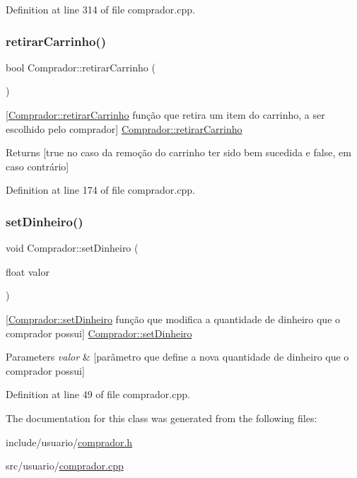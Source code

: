 Definition at line 314 of file comprador.\+cpp.

\mbox{\label{class_comprador_a8a5fc62485a3a9b37340609715e73feb}} 
\subsubsection{\texorpdfstring{retirar\+Carrinho()}{retirarCarrinho()}}
{\footnotesize\ttfamily bool Comprador\+::retirar\+Carrinho (\begin{DoxyParamCaption}{ }\end{DoxyParamCaption})}

\mbox{[}\hyperlink{class_comprador_a8a5fc62485a3a9b37340609715e73feb}{Comprador\+::retirar\+Carrinho} função que retira um item do carrinho, a ser escolhido pelo comprador\mbox{]}  \hyperlink{class_comprador_a8a5fc62485a3a9b37340609715e73feb}{Comprador\+::retirar\+Carrinho} \begin{DoxyReturn}{Returns}
\mbox{[}true no caso da remoção do carrinho ter sido bem sucedida e false, em caso contrário\mbox{]} 
\end{DoxyReturn}


Definition at line 174 of file comprador.\+cpp.

\mbox{\label{class_comprador_a4f22858b4fdd931a81dd8cfcd4783bde}} 
\subsubsection{\texorpdfstring{set\+Dinheiro()}{setDinheiro()}}
{\footnotesize\ttfamily void Comprador\+::set\+Dinheiro (\begin{DoxyParamCaption}\item[{float}]{valor }\end{DoxyParamCaption})}

\mbox{[}\hyperlink{class_comprador_a4f22858b4fdd931a81dd8cfcd4783bde}{Comprador\+::set\+Dinheiro} função que modifica a quantidade de dinheiro que o comprador possui\mbox{]}  \hyperlink{class_comprador_a4f22858b4fdd931a81dd8cfcd4783bde}{Comprador\+::set\+Dinheiro} 
\begin{DoxyParams}{Parameters}
{\em valor} & \mbox{[}parâmetro que define a nova quantidade de dinheiro que o comprador possui\mbox{]} \\
\hline
\end{DoxyParams}


Definition at line 49 of file comprador.\+cpp.



The documentation for this class was generated from the following files\+:\begin{DoxyCompactItemize}
\item 
include/usuario/\hyperlink{comprador_8h}{comprador.\+h}\item 
src/usuario/\hyperlink{comprador_8cpp}{comprador.\+cpp}\end{DoxyCompactItemize}
